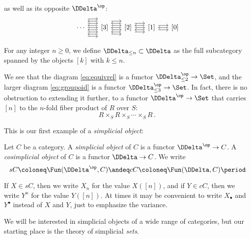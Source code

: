 as well as its opposite $\DDelta^{\op}$:
\[
  \begin{tikzcd}[sep=1.5em, ampersand replacement=\&]
    \cdots \arrow[r] \arrow[r, shift left=1.5ex] \arrow[r, shift right=1.5ex] \arrow[r, shift left=3ex] \arrow[r, shift right=3ex] \&
    {[3]} \arrow[r, shift left=0.75ex] \arrow[r, shift right=0.75ex] \arrow[r, shift right=2.25ex] \arrow[r, shift left=2.25ex] \arrow[l, shift left=0.75ex] \arrow[l, shift right=0.75ex] \arrow[l, shift left=2.25ex] \arrow[l, shift right=2.25ex] \&
    {[2]} \arrow[l] \arrow[l, shift left=1.5ex] \arrow[l, shift right=1.5ex] \arrow[r] \arrow[r, shift left=1.5ex] \arrow[r, shift right=1.5ex] \&
    {[1]} \arrow[l, shift left=0.75ex] \arrow[l, shift right=0.75ex] \arrow[r, shift left=0.75ex] \arrow[r, shift right=0.75ex] \&
    {[0]} \arrow[l]
  \end{tikzcd}%
\]

\begin{notation}
  For any integer $n \geq 0$, we define $\DDelta_{\leq n} \subset \DDelta$ as the full subcategory spanned by the objects $[k]$ with $k \leq n$.
\end{notation}

We see that the diagram \eqref{eq:equivrel} is a functor $\DDelta_{\leq 2}^{\op} \to \Set$, and
the larger diagram \eqref{eq:groupoid} is a functor $\DDelta_{\leq 3}^{\op} \to \Set$.
In fact, there is no obstruction to extending it further, to a functor $\DDelta^{\op} \to \Set$ that carries $[n]$ to the $n$-fold fiber product of $R$ over $S$:
\[
  R \times_S R \times_S \cdots \times_S R \period
\]

This is our first example of a \emph{simplicial object}:
\begin{definition}
  Let $C$ be a category.
  A \emph{simplicial object} of $C$ is a functor $\DDelta^{\op}\to C$.
  A \emph{cosimplicial object} of $C$ is a functor $\DDelta \to C$.
  We write
  \[
    sC \coloneq \Fun(\DDelta^{\op},C)
    \andeq
    cC \coloneq \Fun(\DDelta, C) \period
  \]

  If $X \in sC$, then we write $X_n$ for the value $X([n])$, and
  if $Y \in cC$, then we write $Y^n$ for the value $Y([n])$.
  At times it may be convenient to write $X_\bullet$ and $Y^\bullet$ instead of $X$ and $Y$, just to emphasize the variance.
\end{definition}

We will be interested in simplicial objects of a wide range of categories, but our starting place is the theory of simplicial \emph{sets}.

